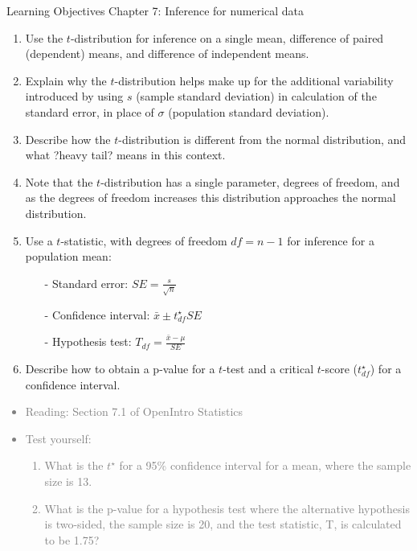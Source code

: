 \documentclass[11pt]{article}
\newcommand{\gray}[1]{\textcolor{gray}{#1}}
\begin{document}
{\LARGE \textcolor{oiB}{Learning Objectives \hfill Chapter 7: Inference for numerical data}} \\

%

\begin{enumerate}
\renewcommand\labelenumi{\textcolor{light}{\textbf{LO \theenumi.}}}

\item Use the $t$-distribution for inference on a single mean, difference of paired (dependent) means, and difference of independent means.

\item Explain why the $t$-distribution helps make up for the additional variability introduced by using $s$ (sample standard deviation) in calculation of the standard error, in place of $\sigma$ (population standard deviation).

\item Describe how the $t$-distribution is different from the normal distribution, and what ?heavy tail? means in this context. 

\item Note that the $t$-distribution has a single parameter, degrees of freedom, and as the degrees of freedom increases this distribution approaches the normal distribution. 

\item Use a $t$-statistic, with degrees of freedom $df = n - 1$ for inference for a population mean:
\begin{itemize}
\item[-] Standard error: $SE = \frac{s}{\sqrt{n}}$
\item[-] Confidence interval: $\bar{x} \pm t_{df}^\star SE$
\item[-] Hypothesis test: $T_{df} = \frac{\bar{x} - \mu}{SE}$
\end{itemize}

\item Describe how to obtain a p-value for a $t$-test and a critical $t$-score ($t^\star_{df}$) for a confidence interval.

\end{enumerate}

\gray{
{\it
\vspace{-0.55cm}
\begin{itemize}
\renewcommand{\labelitemi}{{\textcolor{dark}{$\ast$}}}
\item Reading: Section 7.1 of OpenIntro Statistics
\item Test yourself:
\begin{enumerate}
\item What is the $t^\star$ for a 95\% confidence interval for a mean, where the sample size is 13.
\item What is the p-value for a hypothesis test where the alternative hypothesis is two-sided, the sample size is 20, and the test statistic, T, is calculated to be 1.75? 
\end{enumerate}
\end{itemize}
}}
\end{document}
